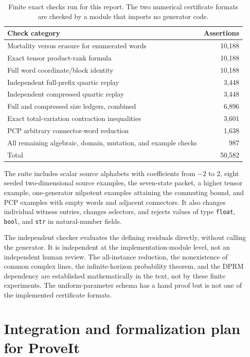 \documentclass[11pt,letterpaper]{article}
\theoremstyle{definition}
\theoremstyle{remark}
\begin{document}
\begin{table}[ht]
\centering\small
\begin{tabular}{@{}lr@{}}
\toprule
Check category & Assertions\\
\midrule
Mortality versus erasure for enumerated words & 10,188\\
Exact tensor product-rank formula & 10,188\\
Full word coordinate/block identity & 10,188\\
Independent full-prefix quartic replay & 3,448\\
Independent compressed quartic replay & 3,448\\
Full and compressed size ledgers, combined & 6,896\\
Exact total-variation contraction inequalities & 3,601\\
PCP arbitrary connector-word reduction & 1,638\\
All remaining algebraic, domain, mutation, and example checks & 987\\
\midrule
Total & 50,582\\
\bottomrule
\end{tabular}
\caption{Finite exact checks run for this report. The two numerical certificate
formats are checked by a module that imports no generator code.}
\label{ste:ee:tab:tests}
\end{table}

The suite includes scalar source alphabets with coefficients from $-2$ to $2$,
eight seeded two-dimensional source examples, the seven-state packet, a higher
tensor example, one-generator nilpotent examples attaining the commuting bound,
and PCP examples with empty words and adjacent connectors. It also changes
individual witness entries, changes selectors, and rejects values of type
\texttt{float}, \texttt{bool}, and \texttt{str} in natural-number fields.

The independent checker evaluates the defining residuals directly, without
calling the generator. It is independent at the implementation-module level,
not an independent human review. The all-instance reduction, the nonexistence
of common complex lines, the infinite-horizon probability theorem, and the
DPRM dependency are established mathematically in the text, not by these finite
experiments. The uniform-parameter schema has a hand proof but is not one of the
implemented certificate formats.

\section{Integration and formalization plan for ProveIt}
\label{ste:ee:sec:formalization}
\end{document}

